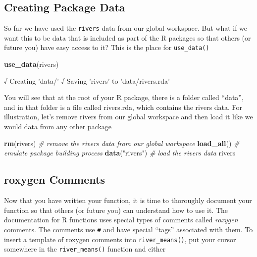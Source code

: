 \documentclass[
]{book}
\newenvironment{Shaded}{\begin{snugshade}}{\end{snugshade}}
\newcommand{\CommentTok}[1]{\textcolor[rgb]{0.56,0.35,0.01}{\textit{#1}}}
\newcommand{\KeywordTok}[1]{\textcolor[rgb]{0.13,0.29,0.53}{\textbf{#1}}}
\newcommand{\NormalTok}[1]{#1}
\newcommand{\StringTok}[1]{\textcolor[rgb]{0.31,0.60,0.02}{#1}}
\begin{document}
\hypertarget{creating-package-data}{%
\subsection{Creating Package Data}\label{creating-package-data}}

So far we have used the \texttt{rivers} data from our global workspace. But what if we want this to be data that is included as part of the R packages so that others (or future you) have easy access to it? This is the place for \texttt{use\_data()}

\begin{Shaded}
\begin{Highlighting}[]
\KeywordTok{use_data}\NormalTok{(rivers)}
\end{Highlighting}
\end{Shaded}

\begin{Shaded}
\begin{Highlighting}[]
\NormalTok{√ Creating }\StringTok{'data/'}
\NormalTok{√ Saving }\StringTok{'rivers'}\NormalTok{ to }\StringTok{'data/rivers.rda'}
\end{Highlighting}
\end{Shaded}

You will see that at the root of your R package, there is a folder called ``data'', and in that folder is a file called rivers.rda, which contains the rivers data. For illustration, let's remove rivers from our global workspace and then load it like we would data from any other package

\begin{Shaded}
\begin{Highlighting}[]
\KeywordTok{rm}\NormalTok{(rivers) }\CommentTok{# remove the rivers data from our global workspace}
\KeywordTok{load_all}\NormalTok{() }\CommentTok{# emulate package building process}
\KeywordTok{data}\NormalTok{(}\StringTok{"rivers"}\NormalTok{) }\CommentTok{# load the rivers data}
\NormalTok{rivers}
\end{Highlighting}
\end{Shaded}

\hypertarget{roxygen-comments}{%
\subsection{roxygen Comments}\label{roxygen-comments}}

Now that you have written your function, it is time to thoroughly document your function so that others (or future you) can understand how to use it. The documentation for R functions uses special types of comments called \emph{roxygen} comments. The comments use \texttt{\#\textquotesingle{}} and have special ``tags'' associated with them. To insert a template of roxygen comments into \texttt{river\_means()}, put your cursor somewhere in the \texttt{river\_means()} function and either
\end{document}

